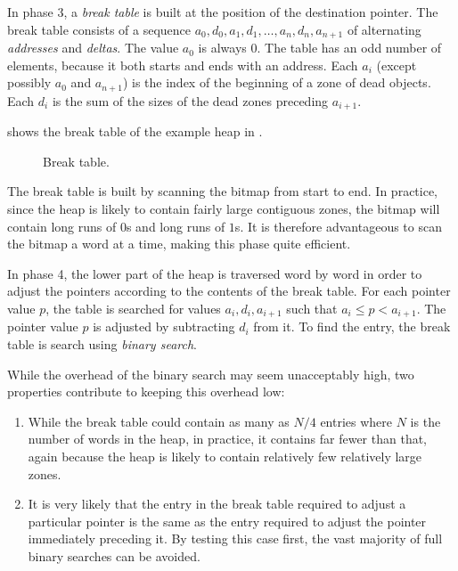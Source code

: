 In phase 3, a \emph{break table} is built at the position of the
destination pointer.  The break table consists of a sequence $a_0,
d_0, a_1, d_1, \ldots, a_n, d_n, a_{n+1}$ of alternating
\emph{addresses} and \emph{deltas}.  The value $a_0$ is always $0$.
The table has an odd number of elements, because it both starts and
ends with an address.  Each $a_i$ (except possibly $a_0$ and
$a_{n+1}$) is the index of the beginning of a zone of dead objects.
Each $d_i$ is the sum of the sizes of the dead zones preceding
$a_{i+1}$.

 shows the break table of the example heap in
.

\begin{figure}
\begin{center}
\end{center}
\caption{\label{fig-example-d}
Break table.}
\end{figure}

The break table is built by scanning the bitmap from start to end.  In
practice, since the heap is likely to contain fairly large contiguous
zones, the bitmap will contain long runs of $0$s and long runs of
$1$s.  It is therefore advantageous to scan the bitmap a word at a
time, making this phase quite efficient. 

In phase 4, the lower part of the heap is traversed word by word in
order to adjust the pointers according to the contents of the break
table.  For each pointer value $p$, the table is searched for values 
$a_i, d_i, a_{i+1}$ such that $a_i \le p < a_{i+1}$.  The
pointer value $p$ is adjusted by subtracting $d_i$ from it.  To find
the entry, the break table is search using \emph{binary search}.

While the overhead of the binary search may seem unacceptably high,
two properties contribute to keeping this overhead low:

\begin{enumerate}
\item While the break table could contain as many as $N/4$ entries
  where $N$ is the number of words in the heap, in practice, it
  contains far fewer than that, again because the heap is likely to
  contain relatively few relatively large zones.
\item It is very likely that the entry in the break table required to
  adjust a particular pointer is the same as the entry required to
  adjust the pointer immediately preceding it.  By testing this case
  first, the vast majority of full binary searches can be avoided.
\end{enumerate}
